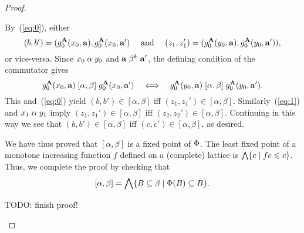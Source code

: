 \documentclass[11pt]{amsart}
\numberwithin{equation}{section}
\theoremstyle{plain}
\theoremstyle{definition}
\begin{document}
\begin{proof}
\begin{enumerate}[(i)]
    By~(\ref{eq:0}), either
    \[
    (b, b') = (g_0^{\mathbf{A}}(x_0, \mathbf{a}), g_0^{\mathbf{A}}(x_0, \mathbf{a}')
    \quad \text{ and } \quad 
    (z_1,z_1')= (g_0^{\mathbf{A}}(y_0, \mathbf{a}), g_0^{\mathbf{A}}(y_0, \mathbf{a}')),
    \]
    or vice-versa.  Since $x_0 \mathrel{\alpha} y_0$ and 
    $\mathbf{a}\mathrel{\beta^k} \mathbf{a}'$, the defining condition of the commutator gives
    \[
    g_0^{\mathbf{A}}(x_0, \mathbf{a}) \mathrel{[\alpha, \beta]} g_0^{\mathbf{A}}(x_0, \mathbf{a}')
    \quad \Longleftrightarrow \quad 
    g_0^{\mathbf{A}}(y_0, \mathbf{a}) \mathrel{[\alpha, \beta]} g_0^{\mathbf{A}}(y_0, \mathbf{a}').
    \]
    This and~(\ref{eq:0}) yield
    $(b,b')\in [\alpha, \beta]$ iff
    $(z_1,z_1')\in [\alpha, \beta]$.
    Similarly~(\ref{eq:1}) and $x_1 \mathrel{\alpha} y_1$ imply
    $(z_1,z_1')\in [\alpha, \beta]$ iff
    $(z_2,z_2')\in [\alpha, \beta]$.  Continuing in this way we see that
    $(b,b')\in [\alpha, \beta]$ iff $(c,c')\in [\alpha, \beta]$, as desired.

    We have thus proved that $[\alpha, \beta]$ is a fixed point of $\Phi$.
    The least fixed point of a monotone increasing function $f$ defined on a
    (complete) lattice is $\bigwedge \{ c \mid f c \leqslant c\}$. %
    Thus, we complete the proof by checking that
    \begin{equation}
      \label{eq:2}
    [\alpha, \beta] =\bigwedge \{ B \subseteq \beta \mid \Phi(B) \subseteq B\}.
    \end{equation}

    TODO: finish proof!
  \end{enumerate}

  
  \vfill
  
\end{proof}
\end{document}
